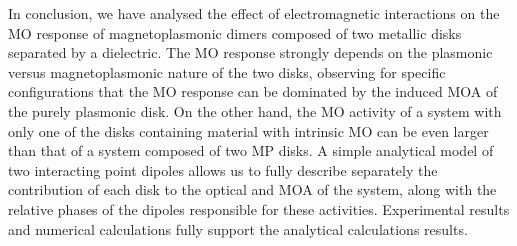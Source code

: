 In conclusion, we have analysed the effect of electromagnetic interactions on the MO response of magnetoplasmonic dimers composed of two metallic disks separated by a dielectric. The MO response strongly depends on the plasmonic versus magnetoplasmonic nature of the two disks, observing for specific configurations that the MO response can be dominated by the induced MOA of the purely plasmonic disk. On the other hand, the MO activity of a system with only one of the disks containing material with intrinsic MO can be even larger than that of a system composed of two MP disks. A simple analytical model of two interacting point dipoles allows us to fully describe separately the contribution of each disk to the optical and MOA of the system, along with the relative phases of the dipoles responsible for these activities. Experimental results and numerical calculations fully support the analytical calculations results.


%
%